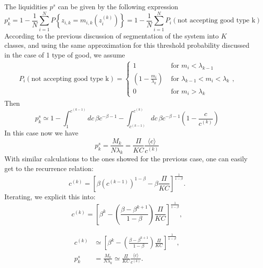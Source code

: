 The liquidities $p^s$ can be given by the following expression
\begin{equation}
p^s_{k} = 1 - \frac{1}{N}\sum_{i=1}^N P\left\{z_{i,k}=m_{i,k}(z_i^{(k)})\right\} = 1 - \frac{1}{N}\sum_{i=1}^N P_i(\text{not accepting good type k}) 
\end{equation}
According to the previous discussion of segmentation of the system into $K$ classes, and using the same approximation for this threshold probability discussed in the case of 1 type of good, we assume
\begin{align}
P_i(\text{not accepting good type k}) = 
\begin{cases}
1 & \text{ for } m_i < \lambda_{k-1} \\
\left( 1 - \frac{m_i}{\lambda_k} \right) & \text{ for } \lambda_{k-1} < m_i < \lambda_k \\
0 & \text{ for } m_i > \lambda_k
\end{cases},
\end{align}
Then
\begin{equation}
p^s_{k} \simeq 1 - \int_{1}^{c^{(k-1)}} dc\, \beta c^{-\beta - 1} - \int_{c^{(k-1)}}^{c^{(k)}} dc\, \beta c^{-\beta - 1} \left( 1 - \frac{c}{c^{(k)}} \right) 
\end{equation}
In this case now we have
\begin{equation}
p_k^s = \frac{M_k}{N \lambda_k} = \frac{\Pi}{K C} \frac{\langle c \rangle}{c^{(k)}}
\end{equation}
With similar calculations to the ones showed for the previous case, one can easily get to the recurrence relation:
\begin{equation}
c^{(k)} = \left[ \beta \left( c^{(k-1)} \right)^{1-\beta} - \beta \frac{\Pi}{K C} \right] ^{\frac{1}{1-\beta}}.
\end{equation}
Iterating, we explicit this into: 
\begin{equation}
c^{(k)} = \left[ \beta^k  - \left( \frac{\beta - \beta^{k+1}}{1-\beta} \right) \frac{\Pi}{K C} \right] ^{\frac{1}{1-\beta}},
\end{equation}
 
\begin{align}
c^{(k)} &\simeq \left[ \beta^k  - \left( \frac{\beta - \beta^{k+1}}{1-\beta} \right) \frac{\Pi}{K C} \right] ^{\frac{1}{1-\beta}},
 \label{Eq:ps_and_ck_generalCaseAnyMathcalM1}
\\
p_k^s &= \frac{M_k}{N \lambda_k} \simeq \frac{\Pi}{K C} \frac{\langle c \rangle}{c^{(k)}}.
 \label{Eq:ps_and_ck_generalCaseAnyMathcalM2}
\end{align}



